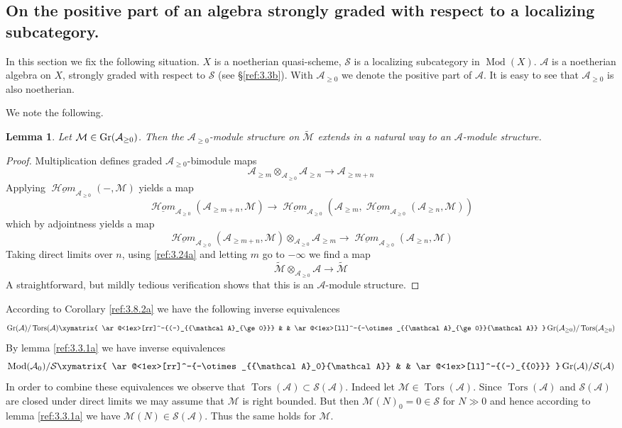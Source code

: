 \documentclass{amsproc}
\def\Ascr{{\mathcal A}}
\def\Hscr{{\mathcal H}}
\def\Mscr{{\mathcal M}}
\def\Sscr{{\mathcal S}}
\def\HHom{\operatorname {\Hscr \mathit{om}}}
\def\uHHom{\underline{\HHom}}
\def\Mod{\mathop{\text{Mod}}}
\def\Gr{\mathop{\text{Gr}}}
\def\Tors{\operatorname{Tors}}
\def\HHom{\operatorname {\Hscr \mathit{om}}}
\def\uHHom{\underline{\HHom}}
\def\Tors{\operatorname {Tors}}
\def\Qch{\operatorname {Mod}}
\def\r{\rightarrow}
\let\oldtext\text
\def\text#1{\oldtext{\upshape #1}}
\newtheorem{lemmas}{Lemma}[subsection]
\theoremstyle{definition}
\theoremstyle{remark}
\numberwithin{equation}{section}
\numberwithin{table}{section}
\numberwithin{figure}{section}
\def\Gr{\mathop{\text{Gr}}}
\begin{document}
\subsection{On the positive part of an algebra strongly graded
with   respect to a localizing subcategory.} 
\label{ref:3.11b}
In this section we fix the
following situation. $X$ is a noetherian quasi-scheme, $\Sscr$ is a
localizing subcategory in $\Qch(X)$. 
$\Ascr$ is a noetherian algebra on $X$,
strongly graded with respect to $\Sscr$ (see \S\ref{ref:3.3b}). With
$\Ascr_{\ge 0}$ we denote the positive part of $\Ascr$. It is easy to see that $\Ascr_{\ge 0}$ is
also noetherian.

We note the following.
\begin{lemmas} 
\label{ref:3.11.1a}
Let $\Mscr\in\Gr(\Ascr_{\ge 0})$. Then the $\Ascr_{\ge
    0}$-module structure on $\tilde{\Mscr}$ extends in a natural way
  to  an $\Ascr$-module structure.
\end{lemmas}
\begin{proof}
Multiplication defines graded $\Ascr_{\ge 0}$-bimodule maps
\[
\Ascr_{\ge m}\otimes_{\Ascr_{\ge 0}}\Ascr_{\ge n}\r \Ascr_{\ge m+n}
\]
Applying $\uHHom_{\Ascr_{\ge 0}}(-,\Mscr)$ yields a map
\[
\uHHom_{\Ascr_{\ge 0}}(\Ascr_{\ge m+n},\Mscr)\r 
\uHHom_{\Ascr_{\ge 0}}(\Ascr_{\ge m},\uHHom_{\Ascr_{\ge 0}}(\Ascr_{\ge
n},\Mscr)) \]
which by adjointness yields a map
\[
\uHHom_{\Ascr_{\ge 0}}(\Ascr_{\ge m+n},\Mscr)\otimes_{\Ascr_{\ge
    0}}\Ascr_{\ge m} 
\r \uHHom_{\Ascr_{\ge 0}}(\Ascr_{\ge n},\Mscr)
\]
Taking direct limits over $n$, using \eqref{ref:3.24a} and letting $m$ go to
$-\infty$ 
we find a map \[
\tilde{\Mscr}\otimes_{\Ascr_{\ge 0}}\Ascr\r \tilde{\Mscr}
\]
A straightforward, but mildly tedious verification shows that this is
an $\Ascr$-module structure.
\end{proof}





According to Corollary \ref{ref:3.8.2a} we have the following inverse
equivalences
\begin{equation}
\label{ref:3.47a}
\Gr(\Ascr)/\Tors(\Ascr) 
\xymatrix{
\ar@<1ex>[rr]^-{(-)_{\Ascr_{\ge 0}}}
&
&
\ar@<1ex>[ll]^-{-\otimes_{\Ascr_{\ge 0}}\Ascr}
}
 \Gr(\Ascr_{\ge 0})/\Tors(\Ascr_{\ge 0})
\end{equation}
By lemma \ref{ref:3.3.1a} we have inverse equivalences
\begin{equation}
\label{ref:3.48a}
\Mod(\Ascr_0)/\Sscr \xymatrix{
\ar@<1ex>[rr]^-{-\otimes_{\Ascr_0}\Ascr}
&
&
\ar@<1ex>[ll]^-{(-)_{{0}}}
}
 \Gr(\Ascr)/\Sscr(\Ascr)
\end{equation}
In order to combine these equivalences we 
observe that
$
\Tors(\Ascr)\subset \Sscr(\Ascr)
$.
Indeed let $\Mscr\in\Tors(\Ascr)$. Since $\Tors(\Ascr)$ and
$\Sscr(\Ascr)$ are closed under direct limits we may assume that $\Mscr$ is
right bounded. But then 
 $\Mscr(N)_0=0\in\Sscr$ for $N\gg 0$
and hence according to lemma \ref{ref:3.3.1a} we have
$\Mscr(N)\in\Sscr(\Ascr)$. Thus the same holds for $\Mscr$.
\end{document}

